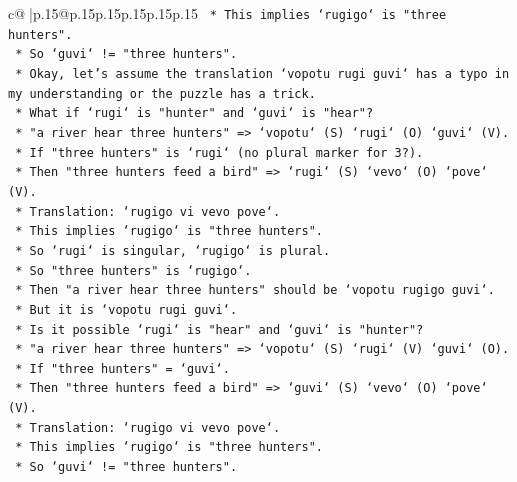 \documentclass{article}
\begin{document}
{\begin{supertabular}{c@{$\;$}|p{.15\linewidth}@{}p{.15\linewidth}p{.15\linewidth}p{.15\linewidth}p{.15\linewidth}p{.15\linewidth}}
{{{\texttt{                        *   This implies `rugigo` is "three hunters".} \\
\texttt{                        *   So `guvi` != "three hunters".} \\
\texttt{                        *   Okay, let's assume the translation `vopotu rugi guvi` has a typo in my understanding or the puzzle has a trick.} \\
\texttt{                        *   What if `rugi` is "hunter" and `guvi` is "hear"?} \\
\texttt{                        *   "a river hear three hunters" => `vopotu` (S) `rugi` (O) `guvi` (V).} \\
\texttt{                        *   If "three hunters" is `rugi` (no plural marker for 3?).} \\
\texttt{                        *   Then "three hunters feed a bird" => `rugi` (S) `vevo` (O) `pove` (V).} \\
\texttt{                        *   Translation: `rugigo vi vevo pove`.} \\
\texttt{                        *   This implies `rugigo` is "three hunters".} \\
\texttt{                        *   So `rugi` is singular, `rugigo` is plural.} \\
\texttt{                        *   So "three hunters" is `rugigo`.} \\
\texttt{                        *   Then "a river hear three hunters" should be `vopotu rugigo guvi`.} \\
\texttt{                        *   But it is `vopotu rugi guvi`.} \\
\texttt{                        *   Is it possible `rugi` is "hear" and `guvi` is "hunter"?} \\
\texttt{                        *   "a river hear three hunters" => `vopotu` (S) `rugi` (V) `guvi` (O).} \\
\texttt{                        *   If "three hunters" = `guvi`.} \\
\texttt{                        *   Then "three hunters feed a bird" => `guvi` (S) `vevo` (O) `pove` (V).} \\
\texttt{                        *   Translation: `rugigo vi vevo pove`.} \\
\texttt{                        *   This implies `rugigo` is "three hunters".} \\
\texttt{                        *   So `guvi` != "three hunters".} \\
}}}
\end{supertabular}}
\end{document}
